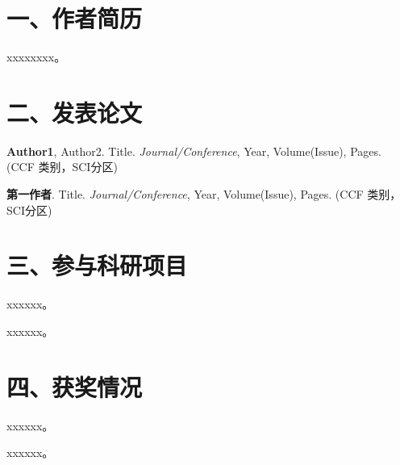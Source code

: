 \begin{mresume}


\section*{一、作者简历}

xxxxxxxx。



\section*{二、发表论文}

\begin{enumerate}[leftmargin=*, parsep=5pt, label={[\arabic*]}]

	\item \textbf{Author1}, Author2. Title. \emph{Journal/Conference}, Year, Volume(Issue), Pages. (CCF 类别，SCI分区)
	
	\item \textbf{第一作者}. Title. \emph{Journal/Conference}, Year, Volume(Issue), Pages. (CCF 类别，SCI分区)
	
\end{enumerate}




\section*{三、参与科研项目}

\begin{enumerate}[leftmargin=*, parsep=5pt, label={[\arabic*]}]
	
	\item xxxxxx。
	
	\item xxxxxx。

\end{enumerate}



\section*{四、获奖情况}

\begin{enumerate}[leftmargin=*, parsep=5pt, label={[\arabic*]}]
	
	\item xxxxxx。
	
	\item xxxxxx。
	
\end{enumerate}


\end{mresume}
